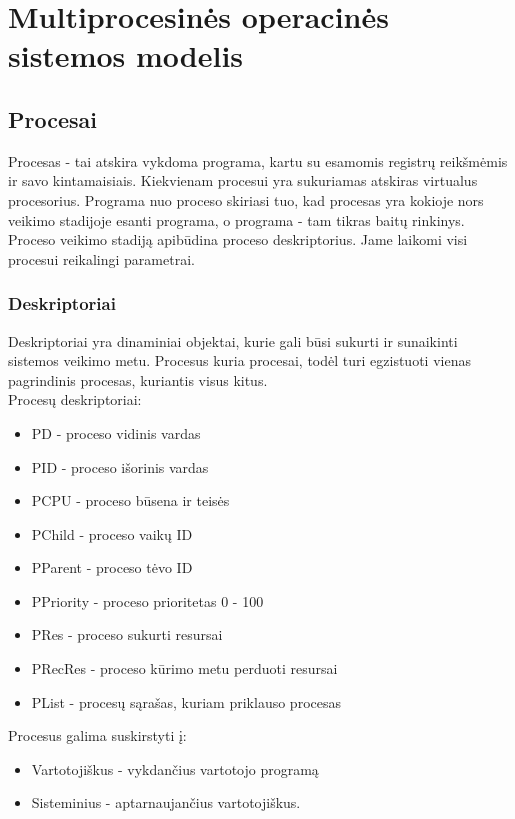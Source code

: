 \section{Multiprocesinės operacinės sistemos modelis}

\subsection{Procesai}

Procesas - tai atskira vykdoma programa, kartu su esamomis registrų reikšmėmis ir savo kintamaisiais.
Kiekvienam procesui yra sukuriamas atskiras virtualus procesorius. Programa nuo proceso skiriasi tuo, kad procesas yra kokioje nors veikimo stadijoje esanti programa,
o programa - tam tikras baitų rinkinys. Proceso veikimo stadiją apibūdina proceso deskriptorius. Jame laikomi visi procesui reikalingi parametrai.\\

\subsubsection{Deskriptoriai}
Deskriptoriai yra dinaminiai objektai, kurie gali būsi sukurti ir sunaikinti sistemos veikimo metu. Procesus kuria procesai, todėl turi egzistuoti vienas pagrindinis procesas, 
kuriantis visus kitus.\\

Procesų deskriptoriai:
	\begin{itemize}
		\item PD - proceso vidinis vardas
		\item PID - proceso išorinis vardas
		\item PCPU - proceso būsena ir teisės
		\item PChild - proceso vaikų ID
		\item PParent - proceso tėvo ID
		\item PPriority - proceso prioritetas 0 - 100
		\item PRes - proceso sukurti resursai
		\item PRecRes - proceso kūrimo metu perduoti resursai
		\item PList - procesų sąrašas, kuriam priklauso procesas
	\end{itemize}

Procesus galima suskirstyti į:
	\begin{itemize}
		\item Vartotojiškus - vykdančius vartotojo programą
		\item Sisteminius - aptarnaujančius vartotojiškus.
	\end{itemize}

